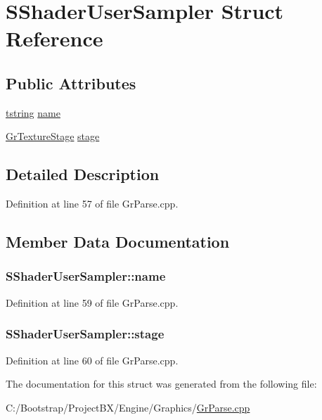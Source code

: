 \hypertarget{struct_s_shader_user_sampler}{
\section{SShaderUserSampler Struct Reference}
\label{struct_s_shader_user_sampler}
}
\subsection*{Public Attributes}
\begin{CompactItemize}
\item 
\hyperlink{common__afx_8h_816fa58fd77499b0edb2c69ebe803d5c}{tstring} \hyperlink{struct_s_shader_user_sampler_e92b8711eca7675a2dad845221b8b242}{name}
\item 
\hyperlink{class_gr_texture_stage}{GrTextureStage} \hyperlink{struct_s_shader_user_sampler_bb2d4666215f21d09a50b58044c9b4aa}{stage}
\end{CompactItemize}


\subsection{Detailed Description}


Definition at line 57 of file GrParse.cpp.

\subsection{Member Data Documentation}
\hypertarget{struct_s_shader_user_sampler_e92b8711eca7675a2dad845221b8b242}{
\subsubsection[{name}]{ {\bf SShaderUserSampler::name}}}
\label{struct_s_shader_user_sampler_e92b8711eca7675a2dad845221b8b242}




Definition at line 59 of file GrParse.cpp.\hypertarget{struct_s_shader_user_sampler_bb2d4666215f21d09a50b58044c9b4aa}{
\subsubsection[{stage}]{ {\bf SShaderUserSampler::stage}}}
\label{struct_s_shader_user_sampler_bb2d4666215f21d09a50b58044c9b4aa}




Definition at line 60 of file GrParse.cpp.

The documentation for this struct was generated from the following file:\begin{CompactItemize}
\item 
C:/Bootstrap/ProjectBX/Engine/Graphics/\hyperlink{_gr_parse_8cpp}{GrParse.cpp}\end{CompactItemize}

